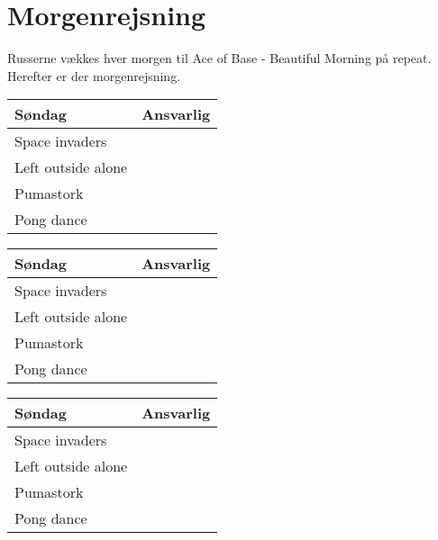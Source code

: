 \documentclass[../../main.tex]{subfiles}
\begin{document}
\section{Morgenrejsning}
Russerne vækkes hver morgen til Ace of Base - Beautiful Morning på repeat. Herefter er der morgenrejsning.

\begin{center}
\begin{tabular}{|p{3cm}|p{7cm}|}
\hline \textbf{Søndag}      & \textbf{Ansvarlig}    \\\hline
\hline  Space invaders      &     \\
\hline  Left outside alone  &     \\
\hline  Pumastork           &     \\
\hline  Pong dance          &     \\

\hline
\end{tabular}

\begin{tabular}{|p{3cm}|p{7cm}|}
\hline \textbf{Søndag}      & \textbf{Ansvarlig}    \\\hline
\hline  Space invaders      &     \\
\hline  Left outside alone  &     \\
\hline  Pumastork           &     \\
\hline  Pong dance          &     \\

\hline
\end{tabular}

\begin{tabular}{|p{3cm}|p{7cm}|}
\hline \textbf{Søndag}      & \textbf{Ansvarlig}    \\\hline
\hline  Space invaders      &     \\
\hline  Left outside alone  &     \\
\hline  Pumastork           &     \\
\hline  Pong dance          &     \\

\hline
\end{tabular}
\end{center}
\end{document}

